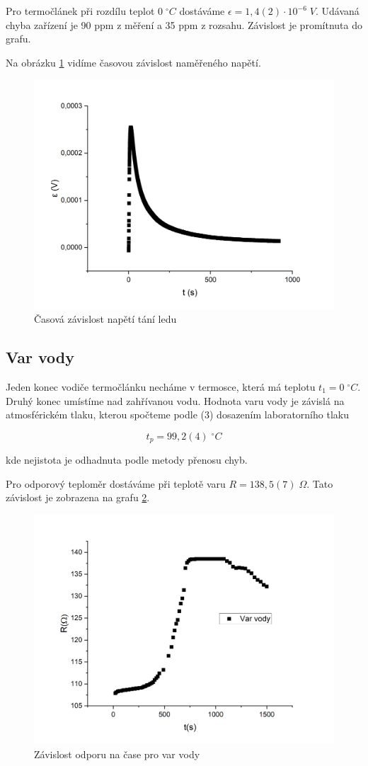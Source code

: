 Pro termočlánek při rozdílu teplot $0 \; ^\circ C$ dostáváme $\epsilon = 1,4(2) \cdot 10^{-6} \; V$. Udávaná chyba zařízení je 90 ppm z měření a 35 ppm z rozsahu. Závislost je promítnuta do grafu.

Na obrázku \ref{fig:napeti-na-cas-led} vidíme časovou závislost naměřeného napětí.

\begin{figure}[h]
    \centering
    \includegraphics[width=0.5\linewidth]{8 - Kalibrace odporového teploměru a termočlánku//Prototkol - kalibrace teploměru//img/Závislost epsilon na čase, led.png}
    \caption{Časová závislost napětí tání ledu}
    \label{fig:napeti-na-cas-led}
\end{figure}


\subsection{Var vody}

Jeden konec vodiče termočlánku necháme v termosce, která má teplotu $t_1 = 0 \; ^\circ C$. Druhý konec umístíme nad zahřívanou vodu. Hodnota varu vody je závislá na atmosférickém tlaku, kterou spočteme podle (3) dosazením laboratorního tlaku

\begin{equation}
    \nonumber
    t_p = 99,2(4) \; ^\circ C
\end{equation}

kde nejistota je odhadnuta podle metody přenosu chyb.

Pro odporový teploměr dostáváme při teplotě varu $R = 138,5(7) \; \Omega$. Tato závislost je zobrazena na grafu \ref{fig:odpor-na-teplote-var}.

\begin{figure}[h]
    \centering
    \includegraphics[width=0.5\linewidth]{8 - Kalibrace odporového teploměru a termočlánku//Prototkol - kalibrace teploměru//img/Závislost R na t, var vody.png}
    \caption{Závislost odporu na čase pro var vody}
    \label{fig:odpor-na-teplote-var}
\end{figure}


